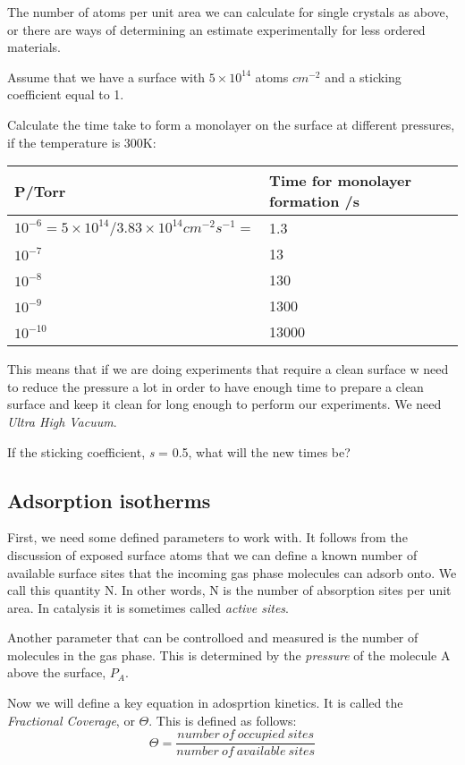 \documentclass[ignorenonframetext]{beamer}
\begin{document}
The number of atoms per unit area we can calculate for single crystals as above, or there are ways of determining an estimate experimentally for less ordered materials.

\begin{example}
Assume that we have a surface with \(5\times10^{14}\) atoms \(cm^{-2}\) and a sticking coefficient equal to 1.

Calculate the time take to form a monolayer on the surface at different pressures, if the temperature is 300K:

\begin{tabular}{ll}
P/Torr & Time for monolayer formation /s\\\hline
\(10^{-6} = 5\times10^{14}/3.83\times10^{14}cm^{-2}s^{-1} = \) & 1.3\\
\(10^{-7}\) & 13\\
\(10^{-8}\) & 130\\
\(10^{-9}\) & 1300\\
\(10^{-10}\) & 13000\\\hline
\end{tabular}

This means that if we are doing experiments that require a clean surface w need to reduce the pressure a lot in order to have enough time to prepare a clean surface and keep it clean for long enough to perform our experiments. We need \textit{Ultra High Vacuum}.

If the sticking coefficient, \textit{s} = 0.5, what will the new times be?
\end{example}

\subsection{Adsorption isotherms}

First, we need some defined parameters to work with. It follows from the discussion of exposed surface atoms that we can define a known number of available surface sites that the incoming gas phase molecules can adsorb onto. We call this quantity N. In other words, N is the number of absorption sites per unit area. In catalysis it is sometimes called \textit{active sites}.

Another parameter that can be controlloed and measured is the number of molecules in the gas phase. This is determined by the \textit{pressure} of the molecule A above the surface, \(P_A\).

Now we will define a key equation in adosprtion kinetics. It is called the \textit{Fractional Coverage}, or \(\Theta\). This is defined as follows:
\begin{equation}
\Theta = \frac{number\ of\ occupied\ sites}{number\ of\ available\ sites}
\end{equation}
\end{document}
